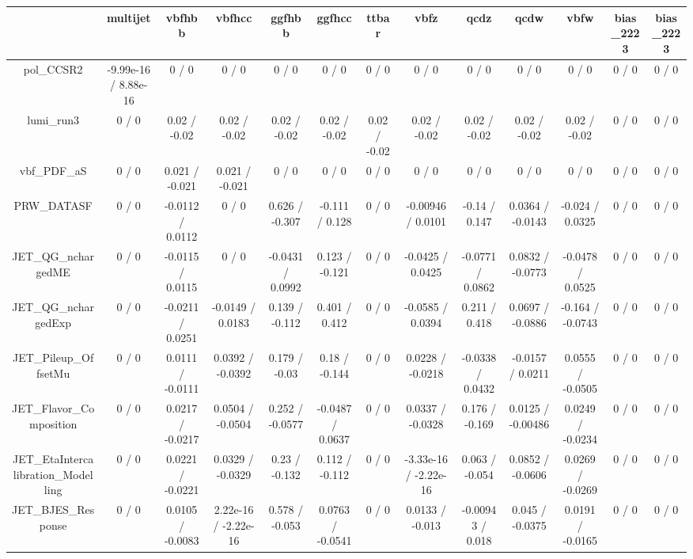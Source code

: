 \documentclass[10pt]{article}
\begin{document}
\begin{table}[htbp]
\begin{center}
\begin{tabular}{|c|c|c|c|c|c|c|c|c|c|c|c|c|}
\hline 
      & multijet      & vbfhbb      & vbfhcc      & ggfhbb      & ggfhcc      & ttbar      & vbfz      & qcdz      & qcdw      & vbfw      & bias_2223      & bias_2223 \\ 
\hline 
  pol_CCSR2 & -9.99e-16 / 8.88e-16 & 0 / 0 & 0 / 0 & 0 / 0 & 0 / 0 & 0 / 0 & 0 / 0 & 0 / 0 & 0 / 0 & 0 / 0 & 0 / 0 & 0 / 0 \\ 
  lumi_run3 & 0 / 0 & 0.02 / -0.02 & 0.02 / -0.02 & 0.02 / -0.02 & 0.02 / -0.02 & 0.02 / -0.02 & 0.02 / -0.02 & 0.02 / -0.02 & 0.02 / -0.02 & 0.02 / -0.02 & 0 / 0 & 0 / 0 \\ 
  vbf_PDF_aS & 0 / 0 & 0.021 / -0.021 & 0.021 / -0.021 & 0 / 0 & 0 / 0 & 0 / 0 & 0 / 0 & 0 / 0 & 0 / 0 & 0 / 0 & 0 / 0 & 0 / 0 \\ 
  PRW_DATASF & 0 / 0 & -0.0112 / 0.0112 & 0 / 0 & 0.626 / -0.307 & -0.111 / 0.128 & 0 / 0 & -0.00946 / 0.0101 & -0.14 / 0.147 & 0.0364 / -0.0143 & -0.024 / 0.0325 & 0 / 0 & 0 / 0 \\ 
  JET_QG_nchargedME & 0 / 0 & -0.0115 / 0.0115 & 0 / 0 & -0.0431 / 0.0992 & 0.123 / -0.121 & 0 / 0 & -0.0425 / 0.0425 & -0.0771 / 0.0862 & 0.0832 / -0.0773 & -0.0478 / 0.0525 & 0 / 0 & 0 / 0 \\ 
  JET_QG_nchargedExp & 0 / 0 & -0.0211 / 0.0251 & -0.0149 / 0.0183 & 0.139 / -0.112 & 0.401 / 0.412 & 0 / 0 & -0.0585 / 0.0394 & 0.211 / 0.418 & 0.0697 / -0.0886 & -0.164 / -0.0743 & 0 / 0 & 0 / 0 \\ 
  JET_Pileup_OffsetMu & 0 / 0 & 0.0111 / -0.0111 & 0.0392 / -0.0392 & 0.179 / -0.03 & 0.18 / -0.144 & 0 / 0 & 0.0228 / -0.0218 & -0.0338 / 0.0432 & -0.0157 / 0.0211 & 0.0555 / -0.0505 & 0 / 0 & 0 / 0 \\ 
  JET_Flavor_Composition & 0 / 0 & 0.0217 / -0.0217 & 0.0504 / -0.0504 & 0.252 / -0.0577 & -0.0487 / 0.0637 & 0 / 0 & 0.0337 / -0.0328 & 0.176 / -0.169 & 0.0125 / -0.00486 & 0.0249 / -0.0234 & 0 / 0 & 0 / 0 \\ 
  JET_EtaIntercalibration_Modelling & 0 / 0 & 0.0221 / -0.0221 & 0.0329 / -0.0329 & 0.23 / -0.132 & 0.112 / -0.112 & 0 / 0 & -3.33e-16 / -2.22e-16 & 0.063 / -0.054 & 0.0852 / -0.0606 & 0.0269 / -0.0269 & 0 / 0 & 0 / 0 \\ 
  JET_BJES_Response & 0 / 0 & 0.0105 / -0.0083 & 2.22e-16 / -2.22e-16 & 0.578 / -0.053 & 0.0763 / -0.0541 & 0 / 0 & 0.0133 / -0.013 & -0.00943 / 0.018 & 0.045 / -0.0375 & 0.0191 / -0.0165 & 0 / 0 & 0 / 0 \\ 

\end{tabular}
\end{center}
\end{table}
\end{document}
